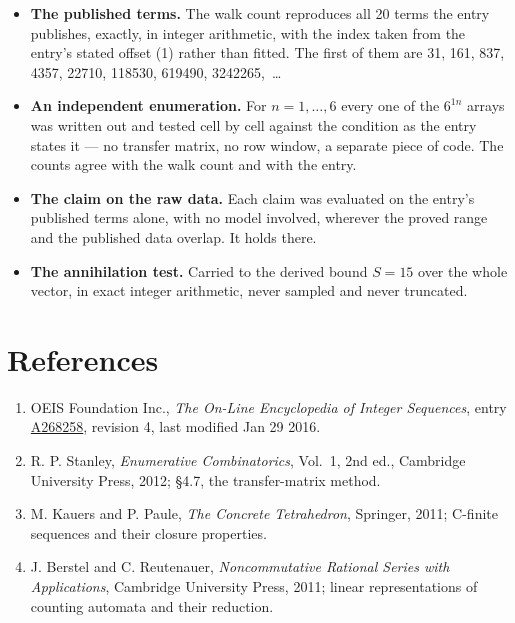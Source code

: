 \documentclass[11pt]{article}
\theoremstyle{definition}
\begin{document}
\begin{itemize}

\item {\bfseries The published terms.} The walk count reproduces all 20 terms the entry publishes, exactly, in integer arithmetic, with the index taken from the entry's stated offset (1) rather than fitted. The first of them are 31, 161, 837, 4357, 22710, 118530, 619490, 3242265,~\dots

\item {\bfseries An independent enumeration.} For $n = 1,\dots,6$ every one of the $6^{1n}$ arrays was written out and tested cell by cell against the condition as the entry states it --- no transfer matrix, no row window, a separate piece of code. The counts agree with the walk count and with the entry.

\item {\bfseries The claim on the raw data.} Each claim was evaluated on the entry's published terms alone, with no model involved, wherever the proved range and the published data overlap. It holds there.

\item {\bfseries The annihilation test.} Carried to the derived bound $S = 15$ over the whole vector, in exact integer arithmetic, never sampled and never truncated.

\end{itemize}

\section{References}

\begin{enumerate}

\item OEIS Foundation Inc., \emph{The On-Line Encyclopedia of Integer Sequences}, entry \href{https://oeis.org/A268258}{A268258}, revision 4, last modified Jan 29 2016.

\item R. P. Stanley, \emph{Enumerative Combinatorics}, Vol.~1, 2nd ed., Cambridge University Press, 2012; \S4.7, the transfer-matrix method.

\item M. Kauers and P. Paule, \emph{The Concrete Tetrahedron}, Springer, 2011; C-finite sequences and their closure properties.

\item J. Berstel and C. Reutenauer, \emph{Noncommutative Rational Series with Applications}, Cambridge University Press, 2011; linear representations of counting automata and their reduction.

\end{enumerate}
\end{document}
